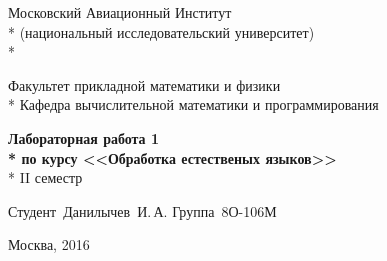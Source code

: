 \begin{titlepage}

\newpage

\begin{center}
Московский Авиационный Институт \\*
(национальный исследовательский университет) \\*

\vspace{2em}

Факультет прикладной математики и физики \\*
Кафедра вычислительной математики и программирования

\vspace{20em}

\Large \textbf{Лабораторная работа 1 \\*
по курсу <<Обработка естественых языков>>} \\*
II семестр

\end{center}

\vspace{15em}

\hspace{30em}\vbox{
	\hbox{Студент Данилычев И.\,А.}
	\hbox{Группа 8О-106М}
}

\vspace{\fill}

\begin{center}
Москва, 2016
\end{center}

\end{titlepage}
